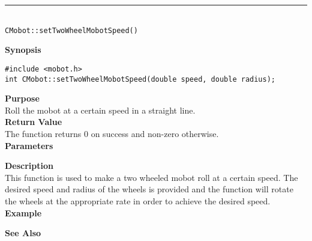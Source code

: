 \noindent
\vspace{5pt}
\rule{4.5in}{0.015in}\\
\noindent
{\LARGE \texttt{CMobot::setTwoWheelMobotSpeed()}}\\
{}

\noindent
{\bf Synopsis}
\vspace{-8pt}
\begin{verbatim}
#include <mobot.h>
int CMobot::setTwoWheelMobotSpeed(double speed, double radius);
\end{verbatim}

\noindent
{\bf Purpose}\\
Roll the mobot at a certain speed in a straight line.\\

\noindent
{\bf Return Value}\\
The function returns 0 on success and non-zero otherwise.\\

\noindent
{\bf Parameters}
\vspace{-0.1in}

\noindent
{\bf Description}\\
This function is used to make a two wheeled mobot roll at a certain speed. The desired 
speed and radius of the wheels is provided and the function will rotate the wheels at the
appropriate rate in order to achieve the desired speed.
\noindent\\
{\bf Example}\\
\noindent

\noindent
{\bf See Also}\\

